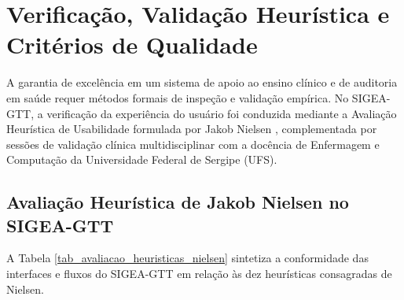 \chapter{Verificação, Validação Heurística e Critérios de Qualidade}
\label{cap_verificacao_validacao_ux}

A garantia de excelência em um sistema de apoio ao ensino clínico e de auditoria em saúde requer métodos formais de inspeção e validação empírica. No SIGEA-GTT, a verificação da experiência do usuário foi conduzida mediante a Avaliação Heurística de Usabilidade formulada por Jakob Nielsen \cite{nielsen1994}, complementada por sessões de validação clínica multidisciplinar com a docência de Enfermagem e Computação da Universidade Federal de Sergipe (UFS).

\section{Avaliação Heurística de Jakob Nielsen no SIGEA-GTT}
\label{sec_heuristica_nielsen}

A Tabela \ref{tab_avaliacao_heuristicas_nielsen} sintetiza a conformidade das interfaces e fluxos do SIGEA-GTT em relação às dez heurísticas consagradas de Nielsen.

